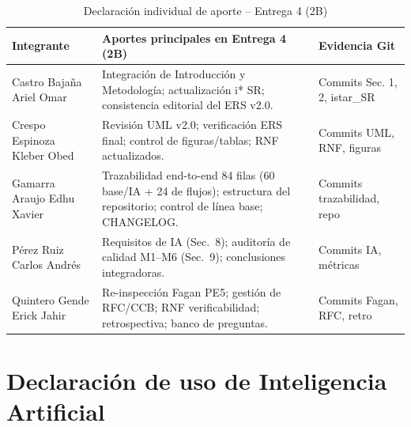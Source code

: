 \documentclass[11pt,a4paper]{article}
\begin{document}
\begin{longtable}{|p{3cm}|p{7cm}|p{4cm}|}
\caption{Declaración individual de aporte -- Entrega 4 (2B)}\\
\hline
\textbf{Integrante} & \textbf{Aportes principales en Entrega 4 (2B)} & \textbf{Evidencia Git} \\
\hline
Castro Bajaña Ariel Omar & Integración de Introducción y Metodología; actualización i* SR; consistencia editorial del ERS v2.0. & Commits Sec. 1, 2, istar\_SR \\
\hline
Crespo Espinoza Kleber Obed & Revisión UML v2.0; verificación ERS final; control de figuras/tablas; RNF actualizados. & Commits UML, RNF, figuras \\
\hline
Gamarra Araujo Edhu Xavier & Trazabilidad end-to-end 84 filas (60 base/IA + 24 de flujos); estructura del repositorio; control de línea base; CHANGELOG. & Commits trazabilidad, repo \\
\hline
Pérez Ruiz Carlos Andrés & Requisitos de IA (Sec.~8); auditoría de calidad M1--M6 (Sec.~9); conclusiones integradoras. & Commits IA, métricas \\
\hline
Quintero Gende Erick Jahir & Re-inspección Fagan PE5; gestión de RFC/CCB; RNF verificabilidad; retrospectiva; banco de preguntas. & Commits Fagan, RFC, retro \\
\hline
\end{longtable}

\section{Declaración de uso de Inteligencia Artificial}
\end{document}

